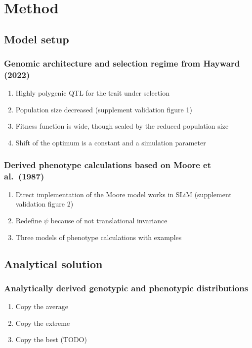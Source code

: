 \documentclass[12pt]{article}
\begin{document}
\section{Method}

\subsection{Model setup}

\subsubsection{Genomic architecture and selection regime from Hayward (2022)}
\begin{enumerate}
    \item Highly polygenic QTL for the trait under selection
    \item Population size decreased (supplement validation figure 1)
    \item Fitness function is wide, though scaled by the reduced population size
    \item Shift of the optimum is a constant and a simulation parameter
\end{enumerate}

\subsubsection{Derived phenotype calculations based on Moore et al.\ (1987)}
\begin{enumerate}
    \item Direct implementation of the Moore model works in SLiM (supplement validation figure 2)
    \item Redefine $\psi$ because of not translational invariance
    \item Three models of phenotype calculations with examples
\end{enumerate}

\subsection{Analytical solution}

\subsubsection{Analytically derived genotypic and phenotypic distributions}
\begin{enumerate}
    \item Copy the average
    \item Copy the extreme
    \item Copy the best (TODO)
\end{enumerate}
\end{document}
